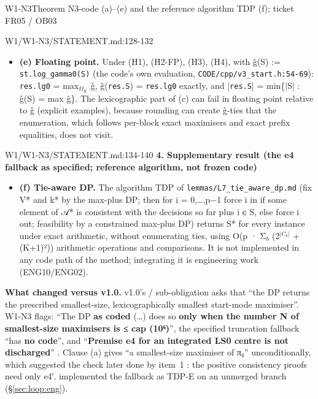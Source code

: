 \begin{card}{W1-N3}{Theorem N3-code (a)–(e) and the reference algorithm TDP (f); ticket FR05 / OB03}
\begin{stmt}{W1/W1-N3/STATEMENT.md:128-132}
\begin{itemize}
\item \textbf{(e) Floating point.} Under (H1), (H2-FP), (H3), (H4), with ĝ(S) := \texttt{st.log\_gamma0(S)} (the code's own evaluation,
\texttt{CODE/cpp/v3\_start.h:54-69}): \texttt{res.lg0} = max$_{\Omega_K}$ ĝ, ĝ(\texttt{res.S}) = \texttt{res.lg0} exactly, and
|\texttt{res.S}| = min\{|S| : ĝ(S) = max ĝ\}. The lexicographic part of (c) can fail in floating point relative to ĝ (explicit
examples), because rounding can create ĝ-ties that the enumeration, which follows per-block exact maximisers and exact
prefix equalities, does not visit.
\end{itemize}
\end{stmt}
\begin{stmt}{W1/W1-N3/STATEMENT.md:134-140}
\textbf{4. Supplementary result (the e4 fallback as specified; reference algorithm, not frozen code)}

\begin{itemize}
\item \textbf{(f) Tie-aware DP.} The algorithm TDP of \texttt{lemmas/L7\_tie\_aware\_dp.md} (fix V* and k* by the max-plus DP; then for
i = 0,…,p−1 force i in if some element of 𝒜* is consistent with the decisions so far plus i ∈ S, else force i out;
feasibility by a constrained max-plus DP) returns S* for every instance under exact arithmetic, without enumerating
ties, using O(p · Σ$_{b}$ (2$^{|C_b|}$ + (K+1)²)) arithmetic operations and comparisons. It is not implemented in any code
path of the method; integrating it is engineering work (ENG10/ENG02).
\end{itemize}
\end{stmt}

\textbf{What changed versus v1.0.} v1.0's / sub-obligation asks that ``the DP returns the prescribed smallest-size, lexicographically smallest start-mode maximiser''. W1-N3 flags: ``The DP \textbf{as coded} (\ldots) does so \textbf{only when the number N of smallest-size maximisers is ≤ cap (10⁶)}'', the specified truncation fallback ``has \textbf{no code}'', and ``\textbf{Premise e4 for an integrated LS0 centre is not discharged}'' . Clause (a) gives ``a smallest-size maximiser of π₀'' unconditionally, which suggested the check later done by  item~1 : the positive consistency proofs need only e4′.  implemented the fallback as TDP-E on an unmerged branch (\S\ref{sec:loop:eng}).


\end{card}
